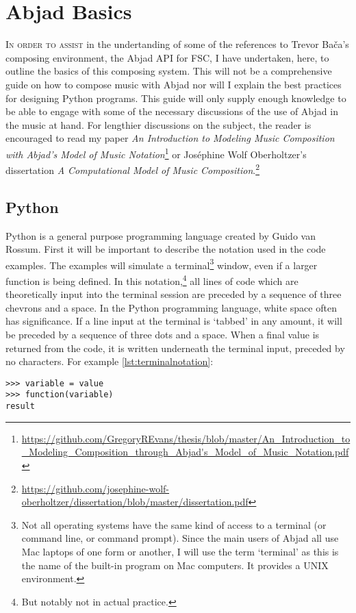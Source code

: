 \chapter{Abjad Basics}
\label{AppendixB}

\lettrine[lines=2,slope=-2pt,nindent=2pt]{\textcolor{SchoolColor}{I}}{n order to assist} in the undertanding of some of the references to Trevor Ba\v{c}a's composing environment, the Abjad \ac{API} for \ac{FSC}, I have undertaken, here, to outline the basics of this composing system. This will not be a comprehensive guide on how to compose music with Abjad nor will I explain the best practices for designing Python programs. This guide will only supply enough knowledge to be able to engage with some of the necessary discussions of the use of Abjad in the music at hand. For lengthier discussions on the subject, the reader is encouraged to read my paper \textit{An Introduction to Modeling Music Composition with Abjad's Model of Music Notation}\footnote{\url{https://github.com/GregoryREvans/thesis/blob/master/An_Introduction_to_Modeling_Composition_through_Abjad's_Model_of_Music_Notation.pdf}} or Joséphine Wolf Oberholtzer's dissertation \textit{A Computational Model of Music Composition}.\footnote{\url{https://github.com/josephine-wolf-oberholtzer/dissertation/blob/master/dissertation.pdf}}

\section{Python}

Python is a general purpose programming language created by Guido van Rossum. First it will be important to describe the notation used in the code examples. The examples will simulate a terminal\footnote{Not all operating systems have the same kind of access to a terminal (or command line, or command prompt). Since the main users of Abjad all use Mac laptops of one form or another, I will use the term `terminal' as this is the name of the built-in program on Mac computers. It provides a UNIX environment.} window, even if a larger function is being defined. In this notation,\footnote{But notably not in actual practice.} all lines of code which are theoretically input into the terminal session are preceded by a sequence of three chevrons and a space. In the Python programming language, white space often has significance. If a line input at the terminal is `tabbed' in any amount, it will be preceded by a sequence of three dots and a space. When a final value is returned from the code, it is written underneath the terminal input, preceded by no characters. For example \autoref{lst:terminalnotation}:
\begin{lstlisting}[frame=tb,caption={Terminal notation},label=lst:terminalnotation]
>>> variable = value
>>> function(variable)
result
\end{lstlisting}

